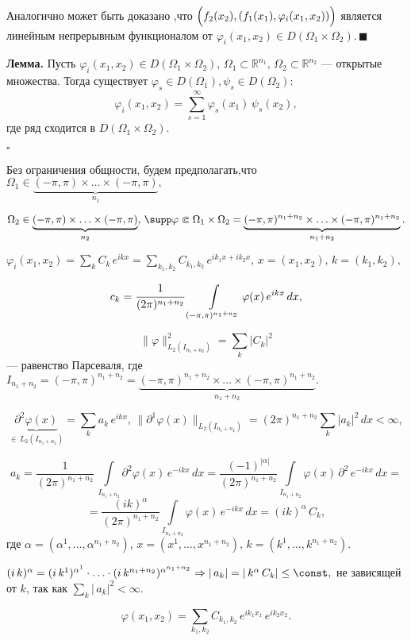 \documentclass[unicode,12pt,draft]{article}
\begin{document}
Аналогично может быть доказано ,что
$\Bigl(f_2(x_2),(f_1(x_1),\varphi_i(x_1,x_2))\Bigr)$ является
линейным не\-прерывным функционалом от $\varphi_i(x_1,x_2)\in
D(\Omega_1\times\Omega_2).\,\blacksquare$

\textbf{Лемма.} Пусть $\varphi_i(x_1,x_2)\in
D(\Omega_1\times\Omega_2),\,\Omega_1\subset\mathbb
R^{n_1},\,\Omega_2\subset\mathbb R^{n_2}$ --- открытые множества.
Тогда существует $\varphi_s\in D(\Omega_1), \psi_s\in
D(\Omega_2)\colon$
$$\varphi_i(x_1,x_2)=\sum_{s=1}^{\infty}\varphi_s(x_1)\,\psi_s(x_2),$$
где ряд сходится в $D(\Omega_1\times\Omega_2).$

$\square$

Без ограничения общности, будем предполагать,что $\Omega_1\in
\underbrace{(-\pi,\pi)\times\ldots\times(-\pi,\pi)}_{n_1},\,$

$\Omega_2\in\underbrace{(-\pi,\pi)\times\ldots\times(-\pi,\pi)}_{n_2},\,
\supp \varphi\Subset\Omega_1\times\Omega_2=
\underbrace{(-\pi,\pi)^{n_1+n_2}\times\ldots\times(-\pi,\pi)^{n_1+n_2}}_{n_1+n_2}.$

$\varphi_i(x_1,x_2)=\sum\limits_k C_k\,e^{ikx}=
\sum\limits_{k_1,k_2}C_{k_1,k_2}\,e^{ik_1x+ik_2x},\,x=(x_1,x_2),\,k=(k_1,k_2),$

$$c_k=\cfrac1{(2\pi)^{n_1+n_2}}\,\int\limits_{(-\pi,\pi)^{n_1+n_2}}\varphi(x)\,e^{ikx}\,dx,$$

$$\|\varphi\|_{L_2(I_{n_1+n_2})}^2=\sum_k |C_k|^2$$ --- равенство
Парсеваля, где $I_{n_1+n_2}=(-\pi,\pi)^{n_1+n_2}=
\underbrace{(-\pi,\pi)^{n_1+n_2}\times\ldots\times(-\pi,\pi)^{n_1+n_2}}_{n_1+n_2}.$

$$\underbrace{\partial^2\varphi(x)}_{\in \,L_2(I_{n_1+n_2})}=
\sum\limits_k a_k \,e^{ikx},\,
\|\partial^1\varphi(x)\|_{L_2(I_{n_1+n_2})}=(2\pi)^{n_1+n_2}
\sum\limits_k |a_k|^2 \,dx<\infty,$$

$$a_k=\frac1{(2\pi)^{n_1+n_2}}\,\int\limits_{I_{n_1+n_2}}\partial^2\varphi(x)\,e^{-ikx}\,dx=
\frac{(-1)^{|\alpha|}}{(2\pi)^{n_1+n_2}}\int\limits_{I_{n_1+n_2}}\varphi(x)\,\partial^2\,e^{-ikx}\,dx=$$
$$=\frac{(ik)^{\alpha}}{(2\pi)^{n_1+n_2}}\int\limits_{I_{n_1+n_2}}\varphi(x)\,e^{-ikx}\,dx=
(ik)^{\alpha}\,C_k,$$ где
$\alpha=(\alpha^1,\ldots,\alpha^{n_1+n_2}),\,x=(x^1,\ldots,x^{n_1+n_2}),\,k=(k^1,\ldots,k^{n_1+n_2}).$

$(i\,k)^{\alpha}=(i\,k^1)^{\alpha^1}\cdot\ldots\cdot(i\,k^{n_1+n_2})^{\alpha^{n_1+n_2}}
\Rightarrow |\,a_k|=|\,k^{\alpha}\,C_k|\le \const  ,$ не зависящей
от $k$, так как $\sum_k |\,a_k|^2<{\infty}.$

$$\varphi(x_1,x_2)=\sum\limits_{k_1,k_2}C_{k_1,k_2}\,e^{ik_1x_1}\,e^{ik_2x_2}.$$
\end{document}
